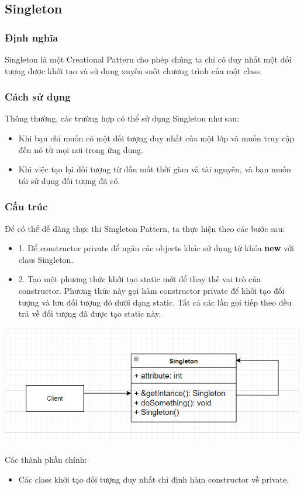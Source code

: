 \subsection{Singleton}
\subsubsection{Định nghĩa}
Singleton là một Creational Pattern cho phép chúng ta chỉ có duy nhất một đối tượng được khởi tạo và sử dụng xuyên suốt chương trình của một class.
\subsubsection{Cách sử dụng}
Thông thường, các trường hợp có thể sử dụng Singleton như sau:
\begin{itemize}
    \item Khi bạn chỉ muốn có một đối tượng duy nhất của một lớp và muốn truy cập đến nó từ mọi nơi trong ứng dụng.
    \item Khi việc tạo lại đối tượng từ đầu mất thời gian và tài nguyên, và bạn muốn tái sử dụng đối tượng đã có.
\end{itemize}
\subsubsection{Cấu trúc}
Để có thể dễ dàng thực thi Singleton Pattern, ta thực hiện theo các bước sau:
\begin{itemize}
    \item 1. Để constructor private để ngăn các objects khác sử dụng từ khóa \textbf{new} với class Singleton.
    \item 2. Tạo một phương thức khởi tạo static mới để thay thế vai trò của constructor. Phương thức này gọi hàm constructor private để khởi tạo đối tượng và lưu đối tượng đó dưới dạng static. Tất cả các lần gọi tiếp theo đều trả về đối tượng đã được tạo static này.
\end{itemize}
\begin{center}
    \includegraphics[]{image/creational/sso.png}
\end{center}
Các thành phần chính:
\begin{itemize}
    \item Các class khởi tạo đối tượng duy nhất chỉ định hàm constructor về private.
\end{itemize}
